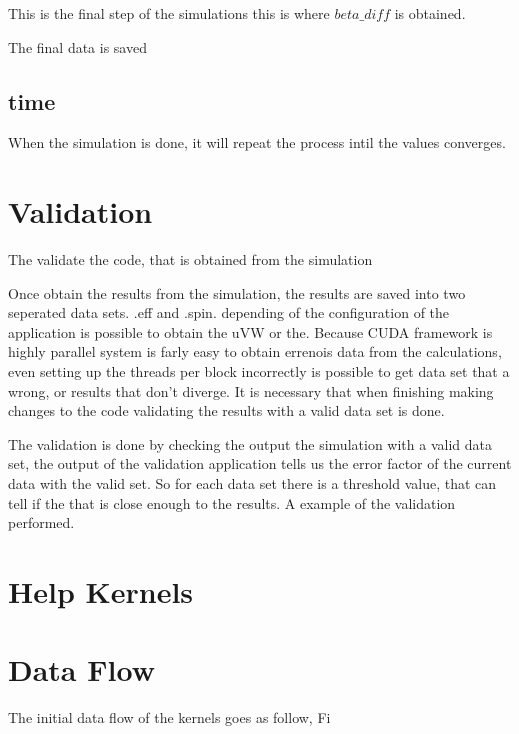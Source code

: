 This is the final step of the simulations this is where $beta\_diff$ is obtained. 

The final data is saved
\subsection{time}

When the simulation is done, it will repeat the process intil the values converges.


\section{Validation}

The validate the code, that is obtained from the simulation

Once obtain the results from the simulation, the results are saved into two seperated data sets. .eff and .spin. depending of the configuration of the application is possible to obtain the uVW or the. Because CUDA framework is highly parallel system is farly easy to obtain errenois data from the calculations, even setting up the threads per block incorrectly is possible to get data set that a wrong, or results that don't diverge. It is necessary that when finishing making changes to the code validating the results with a valid data set is done.

The validation is done by checking the output the simulation with a valid data set, the output of the validation application tells us the error factor of the current data with the valid set. So for each data set there is a threshold value, that can tell if the that is close enough to the results. A example of the validation performed.


\section{Help Kernels}



\section{Data Flow}


The initial data flow of the kernels goes as follow, Fi
